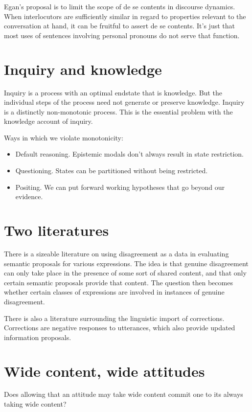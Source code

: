\documentclass[letterpaper,10pt]{article}
\begin{document}
Egan's proposal is to limit the scope of de se contents in discourse dynamics.  When interlocutors are sufficiently similar in regard to properties relevant to the conversation at hand, it can be fruitful to assert de se contents.  It's just that most uses of sentences involving personal pronouns do not serve that function.

\section{Inquiry and knowledge}

Inquiry is a process with an optimal endstate that is knowledge.  But the individual steps of the process need not generate or preserve knowledge.  Inquiry is a distinctly non-monotonic process.  This is the essential problem with the knowledge account of inquiry.  

Ways in which we violate monotonicity:
\begin{itemize}
  \item Default reasoning.  Epistemic modals don't always result in state restriction.
  \item Questioning.  States can be partitioned without being restricted.
  \item Positing. We can put forward working hypotheses that go beyond our evidence.
  
\end{itemize}

\section{Two literatures}

There is a sizeable literature on using disagreement as a data in evaluating semantic proposals for various expressions.  The idea is that genuine disagreement can only take place in the presence of some sort of shared content, and that only certain semantic proposals provide that content.  The question then becomes whether certain classes of expressions are involved in instances of genuine disagreement.

There is also a literature surrounding the linguistic import of corrections.  Corrections are negative responses to utterances, which also provide updated information proposals.

\section{Wide content, wide attitudes}

Does allowing that an attitude may take wide content commit one to its always taking wide content?
\end{document}
